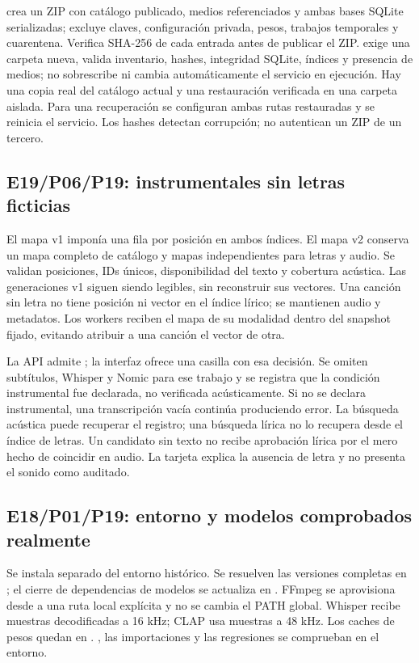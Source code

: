  crea un ZIP con catálogo publicado, medios referenciados y
ambas bases SQLite serializadas; excluye claves, configuración privada, pesos,
trabajos temporales y cuarentena. Verifica SHA-256 de cada entrada antes de
publicar el ZIP.  exige una carpeta nueva,
valida inventario, hashes, integridad SQLite, índices y presencia de medios;
no sobrescribe ni cambia automáticamente el servicio en ejecución. Hay una copia
real del catálogo actual y una restauración verificada en una carpeta aislada.
Para una recuperación se configuran ambas rutas restauradas y se reinicia el
servicio. Los hashes detectan corrupción; no autentican un ZIP de un tercero.

\subsection{E19/P06/P19: instrumentales sin letras ficticias}
El mapa v1 imponía una fila por posición en ambos índices. El mapa v2 conserva
un mapa completo de catálogo y mapas independientes para letras y audio. Se
validan posiciones, IDs únicos, disponibilidad del texto y cobertura acústica.
Las generaciones v1 siguen siendo legibles, sin reconstruir sus vectores.
Una canción sin letra no tiene posición ni vector en el índice lírico; se
mantienen audio y metadatos. Los workers reciben el mapa de su modalidad dentro
del snapshot fijado, evitando atribuir a una canción el vector de otra.

La API admite ; la interfaz ofrece una casilla con esa
decisión. Se omiten subtítulos, Whisper y Nomic para ese trabajo y se registra
que la condición instrumental fue declarada, no verificada acústicamente. Si no
se declara instrumental, una transcripción vacía continúa produciendo error.
La búsqueda acústica puede recuperar el registro; una búsqueda lírica no lo
recupera desde el índice de letras. Un candidato sin texto no recibe aprobación
lírica por el mero hecho de coincidir en audio. La tarjeta explica la ausencia
de letra y no presenta el sonido como auditado.

\subsection{E18/P01/P19: entorno y modelos comprobados realmente}
Se instala  separado del entorno histórico. Se resuelven
las versiones completas en ; el cierre de
dependencias de modelos se actualiza en .
FFmpeg se aprovisiona desde  a una ruta local explícita y
no se cambia el PATH global. Whisper recibe muestras decodificadas a 16 kHz;
CLAP usa muestras a 48 kHz. Los caches de pesos quedan en .
, las importaciones y las regresiones se comprueban en el entorno.

